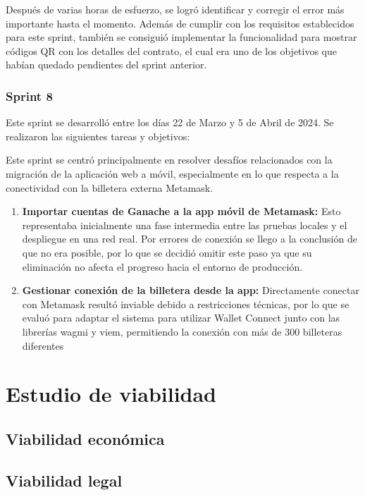 Después de varias horas de esfuerzo, se logró identificar y corregir el error más importante hasta el momento. Además de cumplir con los requisitos establecidos para este sprint, también se consiguió implementar la funcionalidad para mostrar códigos QR con los detalles del contrato, el cual era uno de los objetivos que habían quedado pendientes del sprint anterior. 

\subsubsection{Sprint 8}

Este sprint se desarrolló entre los días 22 de Marzo y 5 de Abril de 2024. Se realizaron las siguientes tareas y objetivos:

Este sprint se centró principalmente en resolver desafíos relacionados con la migración de la aplicación web a móvil, especialmente en lo que respecta a la conectividad con la billetera externa Metamask.

\begin{enumerate}

\item \textbf{Importar cuentas de Ganache a la app móvil de Metamask:} Esto representaba inicialmente una fase intermedia entre las pruebas locales y el despliegue en una red real.
Por errores de conexión se llego a la conclusión de que no era posible, por lo que se decidió omitir este paso ya que su eliminación no afecta el progreso hacia el entorno de producción.

\item \textbf{Gestionar conexión de la billetera desde la app:} Directamente conectar con Metamask resultó inviable debido a restricciones técnicas, por lo que se evaluó para adaptar el sistema para utilizar Wallet Connect junto con las librerías wagmi y viem, permitiendo la conexión con más de 300 billeteras diferentes

\end{enumerate}



\section{Estudio de viabilidad}

\subsection{Viabilidad económica}

\subsection{Viabilidad legal}